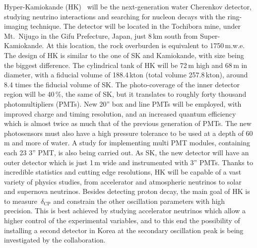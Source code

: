 Hyper-Kamiokande (HK)~\cite{Abe:2018uyc} will be the next-generation water Cherenkov detector, %
studying neutrino interactions and searching for nucleon decays with the ring-imaging technique.
The detector will be located in the Tochibora mine, under Mt.\ Nijugo in the Gifu Prefecture, Japan, 
just 8\,km south from Super-Kamiokande.
At this location, the rock overburden is equivalent to 1750\,m.w.e.
The design of HK is similar to the one of SK and Kamiokande, with size being the biggest difference.
The cylindrical tank of HK will be 72\,m high and 68\,m in diameter, with a fiducial volume of 188.4\,kton (total volume 257.8\,kton), %
around 8.4 times the fiducial volume of SK.
The photo-coverage of the inner detector region will be 40\,\%, the same of SK, %
but it translates to roughly forty thousand photomultipliers (PMTs).
New 20'' box and line PMTs will be employed, with improved charge and timing resolution, %
and an increased quantum efficiency which is almost twice as much that of the previous generation of PMTs.
The new photosensors must also have a high pressure tolerance to be used at a depth of 60\,m and more of water.
A study for implementing multi PMT modules, containing each 23 3'' PMT, is also being carried out.
As SK, the new detector will have an outer detector which is just 1\,m wide and instrumented with 3'' PMTs.
Thanks to incredible statistics and cutting edge resolutions, HK will be capable of a vast variety of physics studies, %
from accelerator and atmospheric neutrinos to solar and supernova neutrinos.
Besides detecting proton decay, the main goal of HK is to measure~$\delta_\text{CP}$ and constrain the other oscillation parameters %
with high precision.
This is best achieved by studying accelerator neutrinos which allow a higher control of the experimental variables, %
and to this end the possibility of installing a second detector in Korea %
at the secondary oscillation peak is being investigated by the collaboration.

